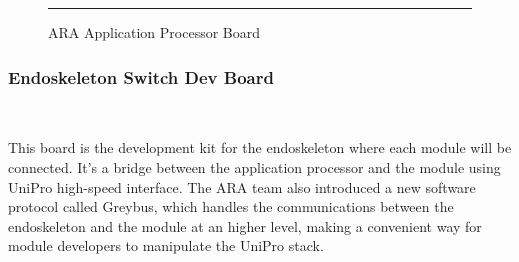 \begin{figure}[htbp]
  \centering
    \rule{35em}{0.5pt}
  \caption[ARA Application Processor Board]{ARA Application Processor Board}
  \label{fig:ap-board}
\end{figure}

\subsubsection{Endoskeleton Switch Dev Board}\

This board is the development kit for the endoskeleton where each module will be connected.
It's a bridge between the application processor and the module using UniPro high-speed interface.
The ARA team also introduced a new software protocol called Greybus, which handles the communications between the endoskeleton and the module at an higher level, making a convenient way for module developers to manipulate the UniPro stack.

